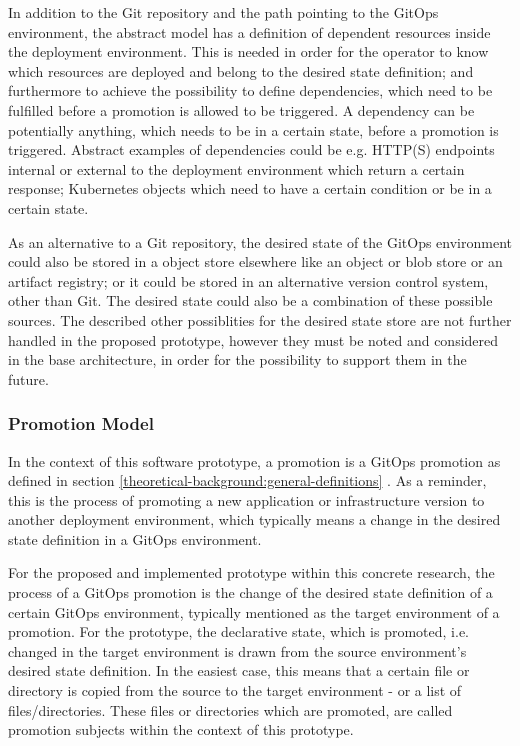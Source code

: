 In addition to the Git repository and the path pointing to the GitOps environment,
the abstract model has a definition of dependent resources inside the deployment environment.
This is needed in order for the operator to know which resources are deployed and belong to the desired state definition;
and furthermore to achieve the possibility to define dependencies,
which need to be fulfilled before a promotion is allowed to be triggered.
A dependency can be potentially anything, which needs to be in a certain state, before a promotion is triggered.
Abstract examples of dependencies could be e.g.
HTTP(S) endpoints internal or external to the deployment environment which return a certain response;
Kubernetes objects which need to have a certain condition or be in a certain state.

As an alternative to a Git repository,
the desired state of the GitOps environment could also be stored in a object store elsewhere
like an object or blob store or an artifact registry;
or it could be stored in an alternative version control system, other than Git.
The desired state could also be a combination of these possible sources.
The described other possiblities for the desired state store are not further handled in the proposed prototype,
however they must be noted and considered in the base architecture, in order for the possibility to support
them in the future.

\subsubsection*{Promotion Model}

In the context of this software prototype,
a promotion is a GitOps promotion as defined in section
\ref{theoretical-background:general-definitions} .
As a reminder, this is the process of promoting a new application or infrastructure version
to another deployment environment, which typically means a change in the desired state definition in a GitOps environment.

For the proposed and implemented prototype within this concrete research,
the process of a GitOps promotion is the change of the desired state definition of a certain GitOps environment,
typically mentioned as the target environment of a promotion. For the prototype,
the declarative state, which is promoted, i.e. changed in the target environment is drawn from the
source environment's desired state definition. In the easiest case, this means that a certain
file or directory is copied from the source to the target environment - or a list of files/directories.
These files or directories which are promoted, are called promotion subjects within the context of this
prototype.

